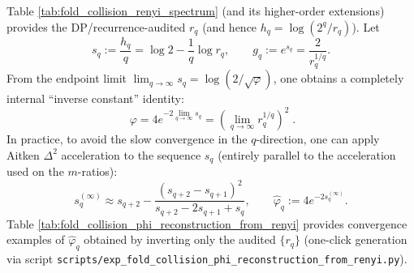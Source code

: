 \begin{remark}\label{rem:pom-recover-phi-from-collision-spectrum}
Table \ref{tab:fold_collision_renyi_spectrum} (and its higher-order extensions) provides the DP/recurrence-audited \(r_q\) (and hence \(h_q=\log(2^q/r_q)\)).
Let
\[
s_q:=\frac{h_q}{q}=\log 2-\frac{1}{q}\log r_q,
\qquad
g_q:=e^{s_q}=\frac{2}{r_q^{1/q}}.
\]
From the endpoint limit \(\lim_{q\to\infty}s_q=\log(2/\sqrt{\varphi})\), one obtains a completely internal ``inverse constant'' identity:
\[
\boxed{\;
\varphi
=4e^{-2\lim_{q\to\infty}s_q}
=\left(\lim_{q\to\infty}r_q^{1/q}\right)^2\; }.
\]
In practice, to avoid the slow convergence in the \(q\)-direction, one can apply Aitken \(\Delta^2\) acceleration to the sequence \(s_q\) (entirely parallel to the acceleration used on the \(m\)-ratios):
\[
s_q^{(\infty)}
\approx
s_{q+2}-\frac{(s_{q+2}-s_{q+1})^2}{s_{q+2}-2s_{q+1}+s_q},
\qquad
\widehat\varphi_q:=4e^{-2s_q^{(\infty)}}.
\]
Table \ref{tab:fold_collision_phi_reconstruction_from_renyi} provides convergence examples of \(\widehat\varphi_q\) obtained by inverting only the audited \(\{r_q\}\) (one-click generation via script \texttt{scripts/exp\_fold\_collision\_phi\_reconstruction\_from\_renyi.py}).
\end{remark}



